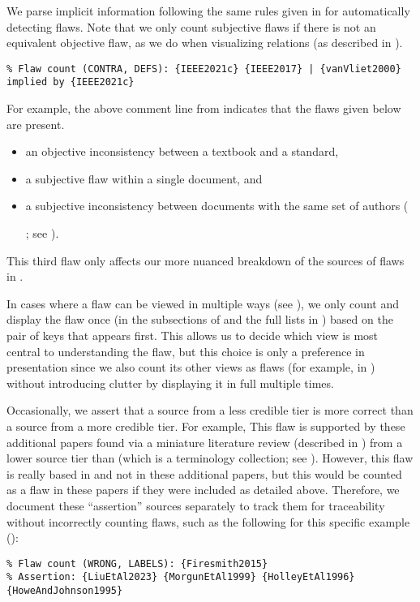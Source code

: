 We parse implicit information following
the same rules given in  for
automatically detecting flaws. Note that we only count subjective flaws if there
is not an equivalent objective flaw, as we do when visualizing relations
(as described in ).
\begin{displayquote}
    \texttt{\% Flaw count (CONTRA, DEFS): \{IEEE2021c\} \{IEEE2017\} |
        \displayNL \{vanVliet2000\} implied by \{IEEE2021c\}}
\end{displayquote}
For example, the above comment line\utd{} from  indicates
that the flaws given below are present.
\begin{itemize}
    \item an objective inconsistency between a textbook and a standard,
    \item a subjective flaw within a single document, and
    \item a subjective inconsistency between documents with the same set of
          authors (\begin{NoHyper}\citeauthor{IEEE2022}\end{NoHyper}; see
          ).
\end{itemize}
This third flaw only affects our more nuanced breakdown of the sources of flaws
in . %

In cases where a flaw can be viewed in multiple ways (see ),
we only count and display the flaw once (in the subsections of  and
the full lists in ) based on the pair of keys that appears
first. This allows us to decide which view is most central to understanding the
flaw, but this choice is only a preference in presentation since we also count
its other views as flaws (for example, in )
without introducing clutter by displaying it in full multiple times.

\label{less-cred-assert}
Occasionally, we assert that a source from a less credible tier is more correct
than a source from a more credible tier.
For example, \tolTestFlaw*{} This flaw is supported by these additional papers
found via a miniature literature review (described in
) from a lower source tier than \citep{Firesmith2015}
(which is a terminology collection; see ). However, this
flaw is really based in \citep{Firesmith2015} and not in these
additional papers, but this would be counted as a flaw in these papers if they
were included as detailed above. Therefore, we document these ``assertion''
sources separately to track them for traceability without incorrectly
counting flaws, such as the following for this specific example
():
\begin{displayquote}
    \texttt{\% Flaw count (WRONG, LABELS): \{Firesmith2015\}\\
        \% Assertion: \{LiuEtAl2023\} \{MorgunEtAl1999\} \{HolleyEtAl1996\}
        \displayNL \{HoweAndJohnson1995\}}
\end{displayquote}


